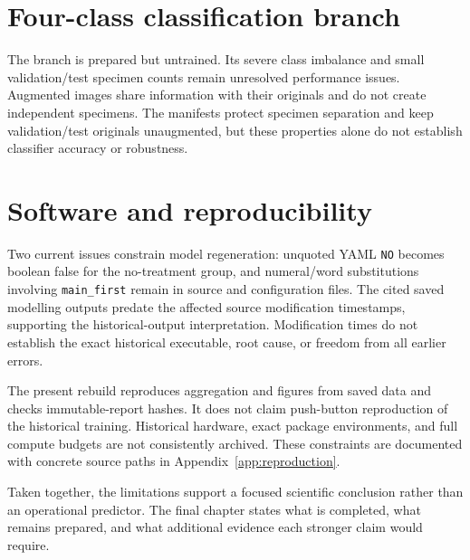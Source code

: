 \section{Four-class classification branch}
The branch is prepared but untrained. Its severe class imbalance and small validation/test specimen counts remain unresolved performance issues. Augmented images share information with their originals and do not create independent specimens. The manifests protect specimen separation and keep validation/test originals unaugmented, but these properties alone do not establish classifier accuracy or robustness.

\section{Software and reproducibility}
Two current issues constrain model regeneration: unquoted YAML \texttt{NO} becomes boolean false for the no-treatment group, and numeral/word substitutions involving \texttt{main\_first} remain in source and configuration files. The cited saved modelling outputs predate the affected source modification timestamps, supporting the historical-output interpretation. Modification times do not establish the exact historical executable, root cause, or freedom from all earlier errors.

The present rebuild reproduces aggregation and figures from saved data and checks immutable-report hashes. It does not claim push-button reproduction of the historical training. Historical hardware, exact package environments, and full compute budgets are not consistently archived. These constraints are documented with concrete source paths in Appendix~\ref{app:reproduction}.

Taken together, the limitations support a focused scientific conclusion rather than an operational predictor. The final chapter states what is completed, what remains prepared, and what additional evidence each stronger claim would require.
